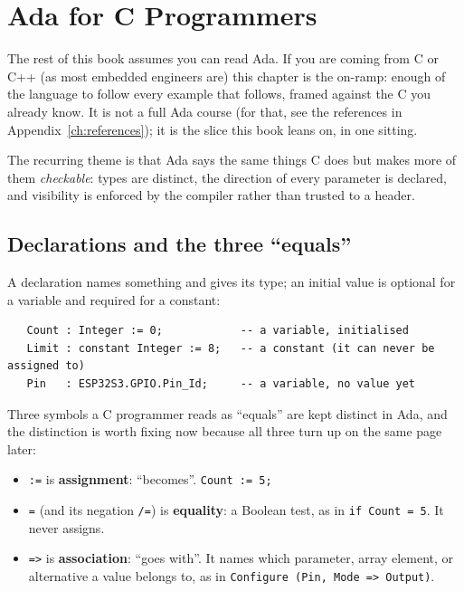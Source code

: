 \chapter{Ada for C Programmers}
\label{ch:ada-primer}

The rest of this book assumes you can read Ada. If you are coming from C or C++
(as most embedded engineers are) this chapter is the on-ramp: enough of the
language to follow every example that follows, framed against the C you already
know. It is not a full Ada course (for that, see the references in
Appendix~\ref{ch:references}); it is the slice this book leans on, in one sitting.

The recurring theme is that Ada says the same things C does but makes more of them
\emph{checkable}: types are distinct, the direction of every parameter is declared,
and visibility is enforced by the compiler rather than trusted to a header.

\section{Declarations and the three ``equals''}

A declaration names something and gives its type; an initial value is optional for
a variable and required for a constant:

\begin{lstlisting}
   Count : Integer := 0;            -- a variable, initialised
   Limit : constant Integer := 8;   -- a constant (it can never be assigned to)
   Pin   : ESP32S3.GPIO.Pin_Id;     -- a variable, no value yet
\end{lstlisting}

Three symbols a C programmer reads as ``equals'' are kept distinct in Ada, and the
distinction is worth fixing now because all three turn up on the same page later:

\begin{itemize}
  \item \texttt{:=} is \textbf{assignment}: ``becomes''. \texttt{Count := 5;}
  \item \texttt{=} (and its negation \texttt{/=}) is \textbf{equality}: a Boolean
        test, as in \texttt{if Count = 5}. It never assigns.
  \item \texttt{=>} is \textbf{association}: ``goes with''. It names which
        parameter, array element, or alternative a value belongs to, as in
        \texttt{Configure (Pin, Mode => Output)}.
\end{itemize}

